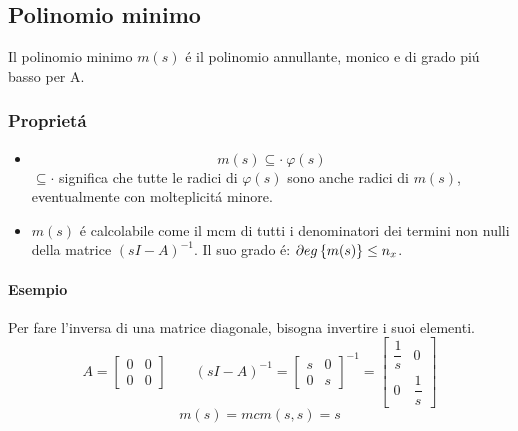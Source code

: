 \documentclass[../main.tex]{subfiles}
\begin{document}
	\subsection{Polinomio minimo}
		Il polinomio minimo $ m(s) $ \'e il polinomio annullante, monico e di grado pi\'u basso per A.
		
	\subsubsection{Propriet\'a}
		\begin{itemize}
			\item 
				\[ 
					m(s) \subseteq \cdot\ \varphi(s)
				\]
				$ \subseteq \cdot $ significa che tutte le radici di $ \varphi(s) $ sono anche radici di $ m(s) $, eventualmente con molteplicit\'a minore.
			\item 
				$ m(s) $ \'e calcolabile come il mcm di tutti i denominatori dei termini non nulli della matrice $ (sI - A)^{-1} $. Il suo grado \'e: $ \partial eg \left\lbrace m(s) \right\rbrace \leq n_x $.
		\end{itemize}
		
		\begin{mdframed}[style=Esempio]
			\paragraph{Esempio}
			Per fare l'inversa di una matrice diagonale, bisogna invertire i suoi elementi. 
			\[
				A =
				\begin{bmatrix}
					0 & 0\\
					0 & 0
				\end{bmatrix} \qquad (sI - A)^{-1} = 
				\begin{bmatrix}
					s & 0\\
					0 & s
				\end{bmatrix}^{-1} = 
				\begin{bmatrix}
					\dfrac{1}{s} & 0\\
					0 & \dfrac{1}{s}
				\end{bmatrix}
			\]
			\[ 
				m(s) = mcm( s, s) = s
			\]
		\end{mdframed}
	
\end{document}
